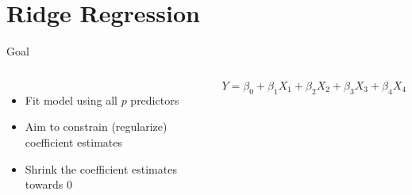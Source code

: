 \documentclass[aspectratio=169,usenames,dvipsnames]{beamer}
\newcommand{\InstructorList}[1]{
\begin{itemize}
	\color{orange}
	#1
\end{itemize}
}
\renewcommand{\InstructorList}[1]{}
\begin{document}
\section{Ridge Regression}
\begin{frame}[c]{Goal}

\begin{columns}
\centering
\begin{itemize}
	\item Fit model using all $p$ predictors
	\item Aim to constrain (regularize) coefficient estimates
	\item Shrink the coefficient estimates towards 0
\end{itemize}
\centering

\begin{equation*}
	Y = \beta_0 + \beta_1 X_1 + \beta_2 X_2 + \beta_3 X_3 + \beta_4 X_4
\end{equation*}
\InstructorList{
\item Ridge regression
\item Lasso
}
\end{columns}

\end{frame}
\end{document}
